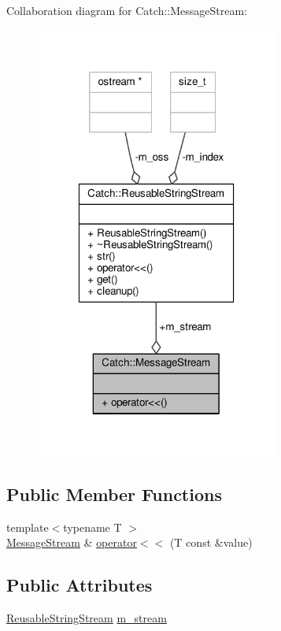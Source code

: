 Collaboration diagram for Catch\-:\-:Message\-Stream\-:
\nopagebreak
\begin{figure}[H]
\begin{center}
\leavevmode
\includegraphics[width=226pt]{struct_catch_1_1_message_stream__coll__graph}
\end{center}
\end{figure}
\subsection*{Public Member Functions}
\begin{DoxyCompactItemize}
\item 
{\footnotesize template$<$typename T $>$ }\\\hyperlink{struct_catch_1_1_message_stream}{Message\-Stream} \& \hyperlink{struct_catch_1_1_message_stream_a554c4aff5925a077e9fe9d858217428d}{operator$<$$<$} (T const \&value)
\end{DoxyCompactItemize}
\subsection*{Public Attributes}
\begin{DoxyCompactItemize}
\item 
\hyperlink{class_catch_1_1_reusable_string_stream}{Reusable\-String\-Stream} \hyperlink{struct_catch_1_1_message_stream_a9202520faed8882ef469db9f353ec578}{m\-\_\-stream}
\end{DoxyCompactItemize}



